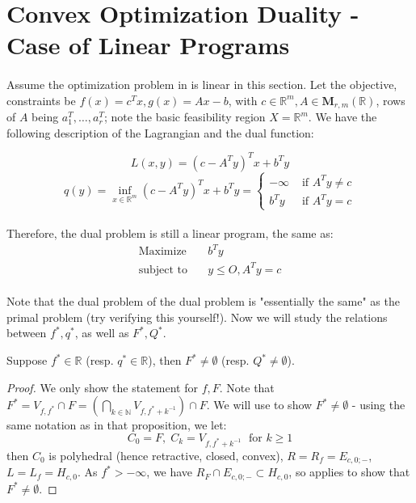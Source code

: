 \section{Convex Optimization Duality - Case of Linear Programs}
\label{sect:043}

\paragraph{}Assume the optimization problem in  is linear in this section. Let the objective, constraints be $f(x)=c^Tx,g(x)=Ax-b$, with $c\in \mathbb{R}^m,A\in \mathbf{M}_{r,m}(\mathbb{R})$, rows of $A$ being $a_1^T,\dotsc,a_r^T$; note the basic feasibility region $X=\mathbb{R}^m$. We have the following description of the Lagrangian and the dual function:

\[
	L(x,y) = (c-A^Ty)^Tx+b^Ty
\]
\[
	q(y) = \inf_{x\in \mathbb{R}^m} (c-A^Ty)^Tx + b^Ty=\begin{cases}
		-\infty & \text{ if }A^Ty\neq c \\
		b^Ty    & \text{ if }A^Ty=c
	\end{cases}
\]

\paragraph{}Therefore, the dual problem is still a linear program, the same as:
\begin{align*}
	\text{Maximize}\quad   & b^Ty           \\
	\text{subject to}\quad & y\leq O,A^Ty=c
\end{align*}

\paragraph{}Note that the dual problem of the dual problem is "essentially the same" as the primal problem (try verifying this yourself!). Now we will study the relations between $f^\ast,q^\ast$, as well as $F^\ast,Q^\ast$.

\begin{prop}[Reachability]\label{prop:042-linear-reachability}
	Suppose $f^\ast\in \mathbb{R}$ (resp. $q^\ast\in \mathbb{R}$), then $F^\ast\neq\emptyset$ (resp. $Q^\ast\neq\emptyset$).
\end{prop}

\begin{proof}
	We only show the statement for $f,F$. Note that $F^\ast=V_{f,f^\ast}\cap F=\left(\bigcap_{k\in \mathbb{N}}V_{f,f^\ast+ k^{-1}}\right)\cap F$. We will use  to show $F^\ast\neq\emptyset$ - using the same notation as in that proposition, we let:
	\[
		C_0=F,\;C_k=V_{f,f^\ast+k^{-1}}\;\text{ for }k\geq 1
	\]
	then $C_0$ is polyhedral (hence retractive, closed, convex), $R=R_f=E_{c,0;-}$, $L=L_f=H_{c,0}$. As $f^\ast>-\infty$, we have $R_F\cap E_{c,0;-}\subset H_{c,0}$, so  applies to show that $F^\ast\neq\emptyset$.
\end{proof}

